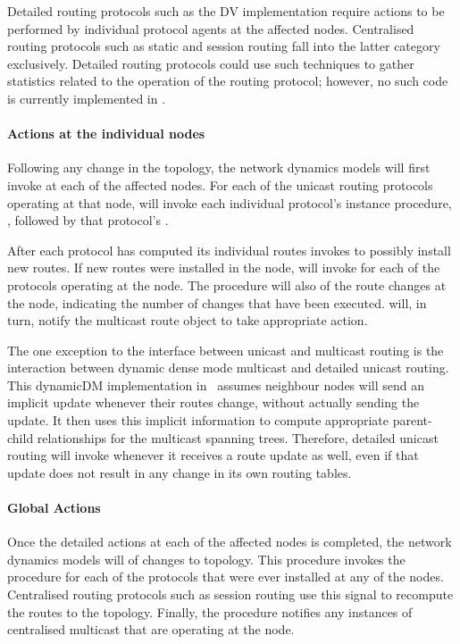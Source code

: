 Detailed routing protocols such as the DV implementation
require actions to be performed by individual protocol agents at the
affected nodes.
Centralised routing protocols such as static and session routing fall into
the latter category exclusively.
Detailed routing protocols could use such techniques to gather statistics
related to the operation of the routing protocol;
however, no such code is currently implemented in \ns.

\paragraph{Actions at the individual nodes}
Following any change in the topology,
the network dynamics models will first invoke
at each of the affected nodes.
For each of the unicast routing protocols operating at that node,
 will invoke 
each individual protocol's instance procedure,  ,
followed by that protocol's .

After each protocol has computed its individual routes
 invokes 
to possibly install new routes.
If new routes were installed in the node,
 will invoke
 for each of the protocols operating at the node.
The procedure will also
of the route changes at the node, indicating the number of changes 
that have been executed.
 will, in turn, notify
the multicast route object to take appropriate action.

The one exception
to the interface between unicast and multicast routing is the interaction
between dynamic dense mode multicast and detailed unicast routing.
This dynamicDM implementation in \ns\ assumes neighbour nodes
will send an implicit update whenever their routes change,
without actually sending the update.  
It then uses this implicit information to compute
appropriate parent-child relationships for the multicast spanning trees.
Therefore, detailed unicast routing will invoke
 whenever it receives a route update as well,
even if that update does not result in any change in its own routing tables.

\paragraph{Global Actions}
Once the detailed actions at each of the affected nodes is completed,
the network dynamics models will
of changes to topology.
This procedure invokes the procedure 
for each of the protocols that were ever installed at any of the nodes.
Centralised routing protocols such as session routing use this signal to
recompute the routes to the topology.
Finally, the  procedure notifies 
any instances of centralised multicast that are operating at the node.

